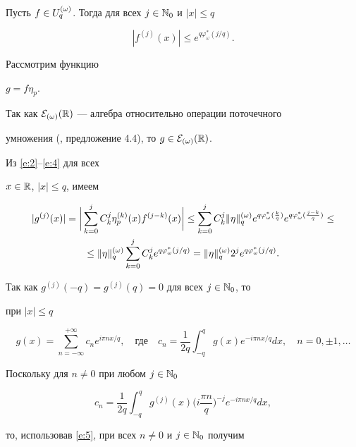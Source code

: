 Пусть $f\in U^{(\omega)}_q$. Тогда для всех $j\in\Bbb N_0$ и $|x|\le q$


\begin{equation}\label{e:4}


|f^{(j)}(x)|\le e^{q\varphi_\omega^*(j/q)}.


\end{equation}


Рассмотрим функцию 


$g=f\eta_p$. 


Так как ${\cal E}_{(\omega)}(\Bbb R)$ --- алгебра относительно операции поточечного


умножения (\cite{Braun}, предложение 4.4),  то $g\in{\cal E}_{(\omega)}(\Bbb R)$. 


Из \eqref{e:2}--\eqref{e:4} для всех 


$x\in\Bbb R$, $|x|\le q$, имеем


\begin{multline}\label{e:5}


|g^{(j)}(x)|=\bigg|\sum_{k=0}^j C_k^j\eta_p^{(k)}(x)f^{(j-k)}(x)\bigg|


\le\sum_{k=0}^j C_k^j\|\eta\|^{(\o)}_qe^{q\vvi(\frac kq)}


e^{q\varphi_\omega^*(\frac {j-k}q)}\le \\


\le\|\eta\|^{(\o)}_q\sum_{k=0}^j C_k^je^{q\vvi(j/q)}=


\|\eta\|^{(\o)}_q2^je^{q\vvi(j/q)}.


\end{multline}


Так как $g^{(j)}(-q)=g^{(j)}(q)=0$ для всех $j\in\Bbb N_0$, то


при $|x|\le q$


$$


g(x)=\sum_{n=-\infty}^{+\infty} c_ne^{i\pi nx/q},


\quad\text{где}\quad


c_n=\frac1{2q}\int_{-q}^qg(x)e^{-i\pi nx/q}dx,\quad


n=0,\pm1,\dotsc


$$


Поскольку для $n\ne0$ при любом $j\in\Bbb N_0$


$$


c_n=\frac1{2q}\int_{-q}^qg^{(j)}(x)\bigg(i\frac{\pi n}q\bigg)


^{-j}e^{-i\pi nx/q}dx,


$$


то, использовав \eqref{e:5}, при всех $n\ne0$ и $j\in\Bbb N_0$ получим


$$


